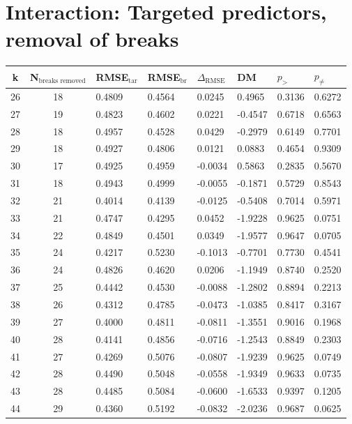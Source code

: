 \documentclass[12pt]{article}
\begin{document}
\section{Interaction: Targeted predictors, removal of breaks}
\begin{table}[htp]
	\centering
	\begin{tabular}{cc|lll|lll}
		k & N$_{\text{breaks removed}}$ & RMSE$_{\text{tar}}$ & RMSE$_{\text{br}}$ & $\Delta_{\text{RMSE}}$ &  DM & $p_>$ & $p_{\not =}$ \\
		\hline
			26 & 18 & 0.4809 & 0.4564 & 0.0245 & 0.4965 & 0.3136 & 0.6272 \\
			27 & 19 & 0.4823 & 0.4602 & 0.0221 & -0.4547 & 0.6718 & 0.6563 \\
			28 & 18 & 0.4957 & 0.4528 & 0.0429 & -0.2979 & 0.6149 & 0.7701 \\
			29 & 18 & 0.4927 & 0.4806 & 0.0121 & 0.0883 & 0.4654 & 0.9309 \\
			30 & 17 & 0.4925 & 0.4959 & -0.0034 & 0.5863 & 0.2835 & 0.5670 \\
			31 & 18 & 0.4943 & 0.4999 & -0.0055 & -0.1871 & 0.5729 & 0.8543 \\
			32 & 21 & 0.4014 & 0.4139 & -0.0125 & -0.5408 & 0.7014 & 0.5971 \\
			33 & 21 & 0.4747 & 0.4295 & 0.0452 & -1.9228 & 0.9625 & 0.0751 \\
			34 & 22 & 0.4849 & 0.4501 & 0.0349 & -1.9577 & 0.9647 & 0.0705 \\
			35 & 24 & 0.4217 & 0.5230 & -0.1013 & -0.7701 & 0.7730 & 0.4541 \\
			36 & 24 & 0.4826 & 0.4620 & 0.0206 & -1.1949 & 0.8740 & 0.2520 \\
			37 & 25 & 0.4442 & 0.4530 & -0.0088 & -1.2802 & 0.8894 & 0.2213 \\
			38 & 26 & 0.4312 & 0.4785 & -0.0473 & -1.0385 & 0.8417 & 0.3167 \\
			39 & 27 & 0.4000 & 0.4811 & -0.0811 & -1.3551 & 0.9016 & 0.1968 \\
			40 & 28 & 0.4141 & 0.4856 & -0.0716 & -1.2543 & 0.8849 & 0.2303 \\
			41 & 27 & 0.4269 & 0.5076 & -0.0807 & -1.9239 & 0.9625 & 0.0749 \\
			42 & 28 & 0.4490 & 0.5048 & -0.0558 & -1.9349 & 0.9633 & 0.0735 \\
			43 & 28 & 0.4485 & 0.5084 & -0.0600 & -1.6533 & 0.9397 & 0.1205 \\
			44 & 29 & 0.4360 & 0.5192 & -0.0832 & -2.0236 & 0.9687 & 0.0625 \\

\end{tabular}
\end{table}
\end{document}
